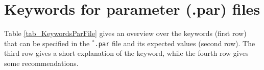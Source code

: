 


\chapter{Keywords for parameter (.par) files}
\label{sec:Keywords}




Table \ref{tab_KeywordsParFile} gives an overview over the keywords (first row) that can be specified in the \texttt{$^{*}$\hspace{-3pt}.par} file and its expected values (second row). The third row gives a short explanation of the keyword, while the fourth row gives some recommendations. 








